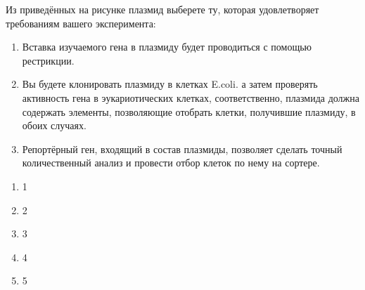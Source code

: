 
Из приведённых на рисунке плазмид выберете ту, которая удовлетворяет требованиям  вашего эксперимента:

\begin{enumerate}
    \item Вставка изучаемого гена в плазмиду будет проводиться с помощью рестрикции.
    \item Вы будете клонировать плазмиду в клетках E.coli. а затем проверять активность гена в эукариотических клетках, соответственно, плазмида должна содержать элементы, позволяющие отобрать клетки, получившие плазмиду, в обоих случаях.
    \item Репортёрный ген, входящий в состав плазмиды, позволяет сделать точный количественный анализ и провести отбор клеток по нему на сортере.
\end{enumerate}






\begin{enumerate}
    \item 1
    \item 2
    \item 3
    \item 4
    \item 5
\end{enumerate}
